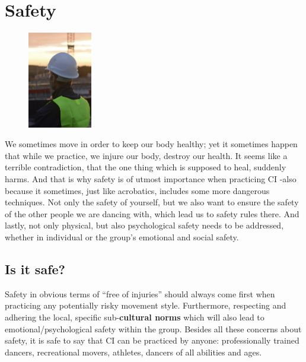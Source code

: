 \section{Safety}\label{sec:safety}

\begin{figure}
    \centering
    \includegraphics[width=0.25\textwidth]{images/safety}
\end{figure}

We sometimes move in order to keep our body healthy; yet it sometimes happen that while we practice, we injure our body, destroy our health.
It seems like a terrible contradiction, that the one thing which is supposed to heal, suddenly harms.
And that is why safety is of utmost importance when practicing CI -also because it sometimes, just like acrobatics, includes some more dangerous techniques.
Not only the safety of yourself, but we also want to ensure the safety of the other people we are dancing with, which lead us to safety rules there.
And lastly, not only physical, but also psychological safety needs to be addressed, whether in individual or the group's emotional and social safety.

\subsection{Is it safe?}\label{subsec:is-it-safe?}

Safety in obvious terms of ``free of injuries'' should always come first when practicing any potentially risky movement style.
Furthermore, respecting and adhering the local, specific sub-\textbf{cultural norms} which will also lead to emotional/psychological safety within the group.
Besides all these concerns about safety, it is safe to say that CI can be practiced by anyone: professionally trained dancers, recreational movers, athletes, dancers of all abilities and ages.

